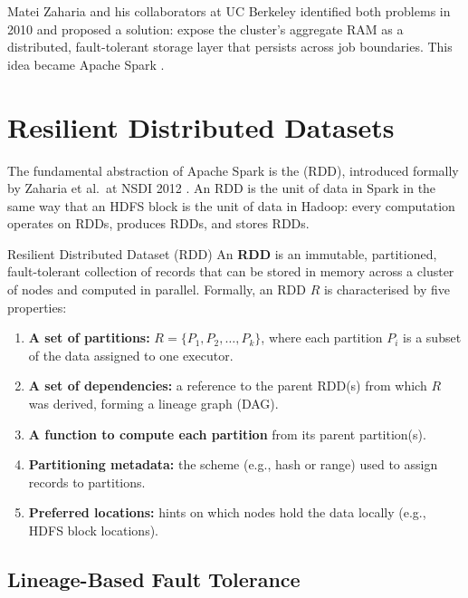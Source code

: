 Matei Zaharia and his collaborators at UC Berkeley identified both problems
in 2010 and proposed a solution: expose the cluster's aggregate RAM as a
distributed, fault-tolerant storage layer that persists across job
boundaries. This idea became Apache Spark \parencite{Spark2010}.

\section{Resilient Distributed Datasets}
\label{sec:rdd}

The fundamental abstraction of Apache Spark is the  (RDD), introduced formally by Zaharia et al.\ at
NSDI 2012 \parencite{RDD2012}. An RDD is the unit of data in Spark in
the same way that an HDFS block is the unit of data in Hadoop: every
computation operates on RDDs, produces RDDs, and stores RDDs.

\begin{defbox}{Resilient Distributed Dataset (RDD)}
An \textbf{RDD} is an immutable, partitioned, fault-tolerant collection
of records that can be stored in memory across a cluster of nodes and
computed in parallel. Formally, an RDD $R$ is characterised by five
properties:
\begin{enumerate}
  \item \textbf{A set of partitions:} $R = \{P_1, P_2, \ldots, P_k\}$,
        where each partition $P_i$ is a subset of the data assigned to
        one executor.
  \item \textbf{A set of dependencies:} a reference to the parent RDD(s)
        from which $R$ was derived, forming a lineage graph (DAG).
  \item \textbf{A function to compute each partition} from its parent
        partition(s).
  \item \textbf{Partitioning metadata:} the scheme (e.g., hash or range)
        used to assign records to partitions.
  \item \textbf{Preferred locations:} hints on which nodes hold the data
        locally (e.g., HDFS block locations).
\end{enumerate}
\end{defbox}

\subsection{Lineage-Based Fault Tolerance}
\label{subsec:lineage}

